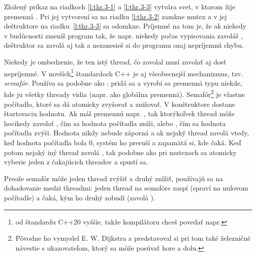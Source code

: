 Zložený príkaz na riadkoch \ref{l:thr.3-1} a \ref{l:thr.3-3} vytvára svet, v ktorom 
žije premenná . Pri jej vytvorení sa na riadku \ref{l:thr.3-2} zamkne mutex 
a v jej deštruktore na riadku~\ref{l:thr.3-3} sa odomkne. Príjemné na tom je, že ak 
niekedy v budúcnosti zmeníš program tak, že napr. niekedy počas vypisovania zavoláš ,
deštruktor  sa zavolá aj tak a nezanesieš si do programu ozaj nepríjemnú chybu.

Niekedy je ombedzenie, že ten istý thread, čo zavolal  musí zavolať aj 
dosť nepríjemné. V novších\footnote{od štandardu C++20 vyššie, takže kompilátoru 
chceš povedať napr. }  štandardoch C++ je
aj všeobecnejší mechanizmus, tzv. {\em semafór}. Používa sa podobne ako : 
pridá sa  a vyrobí sa premenná typu 
niekde, kde ju všetky thready vidia (napr. ako globálna premenná).
Semafór\footnote{Pôvodne ho vymyslel E. W. Dijkstra a predstavoval si pri tom
také železničné návestie s ukazovateľom, ktorý sa môže posúvať hore a dolu.} je
vlastne počítadlo, ktoré sa dá atomicky zvyšovať a znižovať. V konštruktore
dostane štartovaciu hodnotu. Ak máš premennú napr. ,
tak ktorýkoľvek thread môže hocikedy zavolať , čím sa hodnota počítadla zníži, alebo
, čím sa hodnota počítadla zvýši. Hodnota nikdy nebude záporná
a ak nejaký thread zavolá  vtedy, keď hodnota počítadla bola $0$, 
systém ho preruší a zapamätá si, kde čaká. Keď potom nejaký iný thread zavolá 
, tak podobne ako pri mutexoch sa atomicky vyberie jeden z čakajúcich threadov
a spustí sa.

Preože semafór môže jeden thread zvýšiť a druhý znížiť, používajú sa na dohadovanie medzi threadmi:
jeden thread na semafóre zaspí (spraví  na nulovom počítadle) a čaká, kým ho druhý zobudí (zavolá ).

